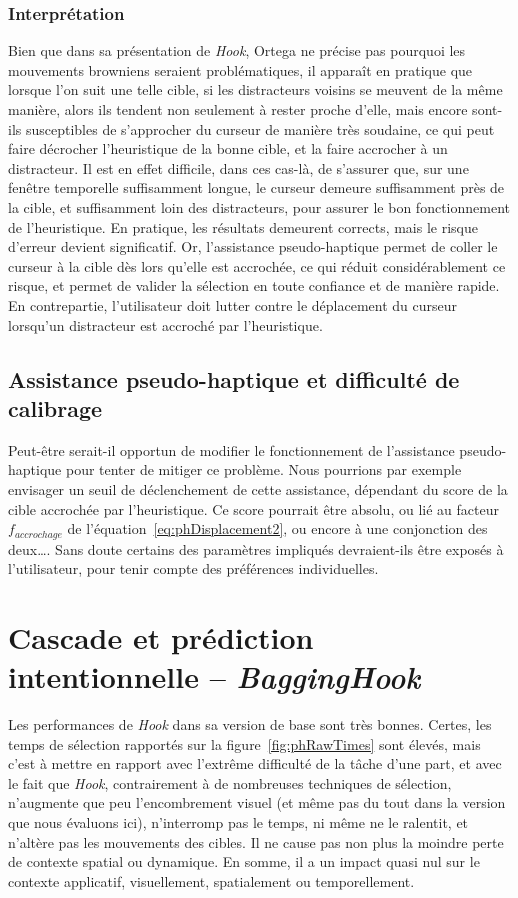 	\subsubsection{Interprétation}
	Bien que dans sa présentation de \emph{Hook}, Ortega ne précise pas pourquoi les mouvements browniens seraient problématiques, il apparaît en pratique que lorsque l'on suit une telle cible, si les distracteurs voisins se meuvent de la même manière, alors ils tendent non seulement à rester proche d'elle, mais encore sont-ils susceptibles de s'approcher du curseur de manière très soudaine, ce qui peut faire \og décrocher \fg{} l'heuristique de la bonne cible, et la faire accrocher à un distracteur. Il est en effet difficile, dans ces cas-là, de s'assurer que, sur une fenêtre temporelle suffisamment longue, le curseur demeure suffisamment près de la cible, et suffisamment loin des distracteurs, pour assurer le bon fonctionnement de l'heuristique. En pratique, les résultats demeurent corrects, mais le risque d'erreur devient significatif. Or, l'assistance pseudo-haptique permet de \og coller \fg{} le curseur à la cible dès lors qu'elle est accrochée, ce qui réduit considérablement ce risque, et permet de valider la sélection en toute confiance et de manière rapide. En contrepartie, l'utilisateur doit \og lutter \fg{} contre le déplacement du curseur lorsqu'un distracteur est accroché par l'heuristique.
	
	\subsection{Assistance pseudo-haptique et difficulté de calibrage}
	Peut-être serait-il opportun de modifier le fonctionnement de l'assistance pseudo-haptique pour tenter de mitiger ce problème. Nous pourrions par exemple envisager un seuil de déclenchement de cette assistance, dépendant du score de la cible accrochée par l'heuristique. Ce score pourrait être absolu, ou lié au facteur $f_{accrochage}$ de l'équation~\ref{eq:phDisplacement2}, ou encore à une conjonction des deux\ldots{}. Sans doute certains des paramètres impliqués devraient-ils être exposés à l'utilisateur, pour tenir compte des préférences individuelles.

	
	\section{Cascade et prédiction intentionnelle -- \emph{BaggingHook}}
	Les performances de \emph{Hook} dans sa version de base sont très bonnes. Certes, les temps de sélection rapportés sur la figure~\ref{fig:phRawTimes} sont élevés, mais c'est à mettre en rapport avec l'extrême difficulté de la tâche d'une part, et avec le fait que \emph{Hook}, contrairement à de nombreuses techniques de sélection, n'augmente que peu l'encombrement visuel (et même pas du tout dans la version que nous évaluons ici), n'interromp pas le temps, ni même ne le ralentit, et n'altère pas les mouvements des cibles. Il ne cause pas non plus la moindre perte de contexte spatial ou dynamique. En somme, il a un impact quasi nul sur le contexte applicatif, visuellement, spatialement ou temporellement.
	
